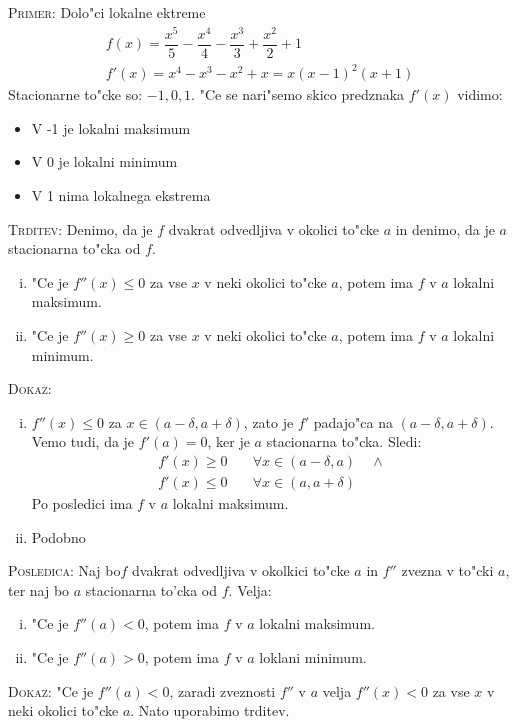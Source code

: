 \textsc{Primer:} Dolo"ci lokalne ektreme
\begin{gather*}
f(x) = \dfrac{x^5}{5} - \dfrac{x^4}{4} - \dfrac{x^3}{3} + \dfrac{x^2}{2} + 1 \\
f'(x) = x^4 - x^3 -x^2 + x = x (x-1)^2 (x+1)
\end{gather*}
Stacionarne to"cke so: $-1, 0, 1$. "Ce se nari"semo skico predznaka $f'(x)$ vidimo:
\begin{itemize}
	\item V -1 je lokalni maksimum
	\item V 0 je lokalni minimum
	\item V 1 nima lokalnega ekstrema
\end{itemize}
%
\textsc{Trditev:} Denimo, da je $f$ dvakrat odvedljiva v okolici to"cke $a$ in denimo, da je $a$ stacionarna to"cka od $f$.
\begin{enumerate}[(i)]
	\item "Ce je $f''(x) \leq 0$ za vse $x$ v neki okolici to"cke $a$, potem ima $f$ v $a$ lokalni maksimum.
	\item "Ce je $f''(x) \geq 0$ za vse $x$ v neki okolici to"cke $a$, potem ima $f$ v $a$ lokalni minimum.
\end{enumerate}
\textsc{Dokaz:}
\begin{enumerate}[(i)]
	\item $f''(x) \leq 0$ za $x \in (a - \delta, a + \delta)$, zato je $f'$ padajo"ca na $(a - \delta, a + \delta)$. Vemo tudi, da je $f'(a) = 0$, ker je $a$ stacionarna to"cka. Sledi:
	\begin{align*}
	f'(x) \geq 0& \quad \forall x \in (a- \delta, a) \quad \land \\
	f'(x) \leq 0& \quad \forall x \in (a, a + \delta)
	\end{align*}
	Po posledici ima $f$ v $a$ lokalni maksimum.
	
	\item Podobno
\end{enumerate}
%
\textsc{Posledica:} Naj bo$f$ dvakrat odvedljiva v okolkici to"cke $a$ in $f''$ zvezna v to"cki $a$, ter naj bo $a$ stacionarna to'cka od $f$. Velja:
\begin{enumerate}[(i)]
	\item "Ce je $f''(a) < 0$, potem ima $f$ v $a$ lokalni maksimum.
	\item "Ce je $f''(a) > 0$, potem ima $f$ v $a$ loklani minimum.
\end{enumerate}
\textsc{Dokaz:} "Ce je $f''(a) < 0$, zaradi zveznosti $f''$ v $a$ velja $f''(x) < 0$ za vse $x$ v neki okolici to"cke $a$. Nato uporabimo trditev.

